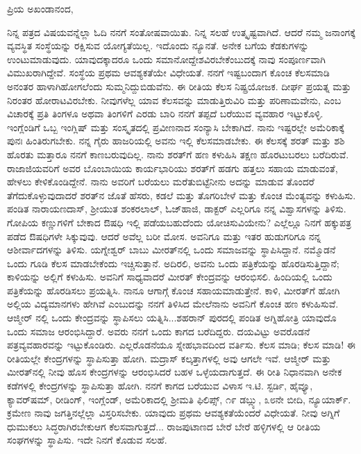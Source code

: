\noindent
ಪ್ರಿಯ ಅಖಂಡಾನಂದ,

ನಿನ್ನ ಪತ್ರದ ವಿಷಯವನ್ನೆಲ್ಲಾ ಓದಿ ನನಗೆ ಸಂತೋಷವಾಯಿತು. ನಿನ್ನ ಸಲಹೆ ಉತ್ಕೃಷ್ಟವಾಗಿದೆ. ಆದರೆ ನಮ್ಮ ಜನಾಂಗಕ್ಕೆ ವ್ಯವಸ್ಥಿತ ಸಂಸ್ಥೆಯನ್ನು ರಕ್ಷಿಸುವ ಯೋಗ್ಯತೆಯಿಲ್ಲ. ಇದೊಂದು ನ್ಯೂನತೆ. ಅನೇಕ ಬಗೆಯ ಕೆಡಕುಗಳನ್ನು ಉಂಟುಮಾಡುವುದು. ಯಾವುದಕ್ಕಾದರೂ ಒಂದು ಸಮಾನೋದ್ದೇಶವಿರಬೇಕೆಂಬುದಕ್ಕೆ ನಾವು ಸಂಪೂರ್ಣವಾಗಿ ವಿಮುಖರಾಗಿದ್ದೇವೆ. ಸಂಸ್ಥೆಯ ಪ್ರಥಮ ಆವಶ್ಯಕತೆಯೇ ವಿಧೇಯತೆ. ನನಗೆ ಇಷ್ಟಬಂದಾಗ ಕೊಂಚ ಕೆಲಸಮಾಡಿ ಅನಂತರ ಹಾಳಾಗಿಹೋಗಲೆಂದು ಸುಮ್ಮನಿದ್ದುಬಿಡುವೆನು. ಈ ರೀತಿಯ ಕೆಲಸ ನಿಷ್ಪ್ರಯೋಜಕ. ದೀರ್ಘ ಪ್ರಯತ್ನ ಮತ್ತು ನಿರಂತರ ಹೋರಾಟವಿರಬೇಕು. ನೀವುಗಳೆಲ್ಲ ಯಾವ ಕೆಲಸವನ್ನು ಮಾಡುತ್ತಿರುವಿರಿ ಮತ್ತು ಪರಿಣಾಮವೇನು, ಎಂಬ ವಿಚಾರಕ್ಕೆ ಪ್ರತಿ ತಿಂಗಳೂ ಅಥವಾ ತಿಂಗಳಿಗೆ ಎರಡು ಬಾರಿ ನನಗೆ ತಪ್ಪದೆ ಬರೆಯುವ ವ್ಯವಹಾರ ಇಟ್ಟುಕೊಳ್ಳಿ. ಇಂಗ್ಲೆಂಡಿಗೆ ಒಬ್ಬ ಇಂಗ್ಲಿಷ್ ಮತ್ತು ಸಂಸ್ಕೃತದಲ್ಲಿ ಪ್ರವೀಣನಾದ ಸಂನ್ಯಾಸಿ ಬೇಕಾಗಿದೆ. ನಾನು ಇಷ್ಟರಲ್ಲೇ ಅಮೆರಿಕಾಕ್ಕೆ ಪುನಃ ಹಿಂತಿರುಗಬೇಕು. ನನ್ನ ಗೈರು ಹಾಜರಿಯಲ್ಲಿ ಅವನು ಇಲ್ಲಿ ಕೆಲಸಮಾಡಬೇಕು. ಈ ಕೆಲಸಕ್ಕೆ ಶರತ್ ಮತ್ತು ಶಶಿ ಹೊರತು ಮತ್ತಾರೂ ನನಗೆ ಕಾಣಬರುವುದಿಲ್ಲ. ನಾನು ಶರತ್‌ಗೆ ಹಣ ಕಳುಹಿಸಿ ತಕ್ಷಣ ಹೊರಟುಬರಲು ಬರೆದಿರುವೆ. ರಾಜಾಜಿಯವರಿಗೆ ಅವರ ಬೊಂಬಾಯಿಯ ಕಾರ್ಯಭಾರಿಯು ಶರತ್‌ಗೆ ಹಡಗು ಹತ್ತಲು ಸಹಾಯ ಮಾಡುವಂತೆ, ಹೇಳಲು ಕೇಳಿಕೊಂಡಿದ್ದೇನೆ. ನಾನು ಅವರಿಗೆ ಬರೆಯಲು ಮರೆತುಬಿಟ್ಟೆ\enginline{-}ನೀನು ಅದನ್ನು ಮಾಡುವ ತೊಂದರೆ ತೆಗೆದುಕೊಳ್ಳುವುದಾದರೆ ಶರತ್‌ನ ಜೊತೆ ಹೆಸರು, ಕಡಲೆ ಮತ್ತು ತೊಗರಿಬೇಳೆ ಮತ್ತು ಕೊಂಚ ಮೆಂತ್ಯವನ್ನು ಕಳುಹಿಸು. ಪಂಡಿತ ನಾರಾಯಣದಾಸ್, ಶ‍್ರೀಯುತ ಶಂಕರಲಾಲ್, ಓಜ್‌ಹಾಜಿ, ಡಾಕ್ಟರ್ ಎಲ್ಲರಿಗೂ ನನ್ನ ವಿಶ್ವಾಸಗಳನ್ನು ತಿಳಿಸು. ಗೋಪಿಯ ಕಣ್ಣುಗಳಿಗೆ ಬೇಕಾದ ಔಷಧಿ ಇಲ್ಲಿ ಪಡೆಯಬಹುದೆಂದು ಯೋಚಿಸುವಿಯೇನು? ಎಲ್ಲೆಲ್ಲೂ ನಿನಗೆ ಹಕ್ಕುಪತ್ರ ಪಡೆದ ಔಷಧಿಗಳೇ ಸಿಕ್ಕುವುವು. ಆದರೆ ಅವೆಲ್ಲ ಬರೀ ಮೋಸ. ಅವನಿಗೂ ಮತ್ತು ಇತರ ಹುಡುಗರಿಗೂ ನನ್ನ ಆಶೀರ್ವಾದಗಳನ್ನು ತಿಳಿಸು. ಯಗ್ನೇಶ್ವರ್ ಬಾಬು ಮೀರತ್‌ನಲ್ಲಿ ಒಂದು ಸಮಾಜವನ್ನು ಸ್ಥಾಪಿಸಿದ್ದಾನೆ. ನಮ್ಮೊಡನೆ ಒಂದು ಗೂಡಿ ಕೆಲಸ ಮಾಡಬೇಕೆಂದು ಇಚ್ಚಿಸುತ್ತಾನೆ. ಅದಿರಲಿ, ಅವನು ಒಂದು ಪತ್ರಿಕೆಯನ್ನು ಹೊರಡಿಸುತ್ತಿದ್ದಾನೆ; ಕಾಳಿಯನ್ನು ಅಲ್ಲಿಗೆ ಕಳುಹಿಸು. ಅವನಿಗೆ ಸಾಧ್ಯವಾದರೆ ಮೀರತ್ ಕೇಂದ್ರವನ್ನು ಆರಂಭಿಸಲಿ. ಹಿಂದಿಯಲ್ಲಿ ಒಂದು ಪತ್ರಿಕೆಯನ್ನು ಹೊರಡಿಸಲು ಪ್ರಯತ್ನಿಸಿ. ನಾನೂ ಆಗಾಗ್ಗೆ ಕೊಂಚ ಸಹಾಯಮಾಡುತ್ತೇನೆ. ಕಾಳಿ, ಮೀರತ್‌ಗೆ ಹೋಗಿ ಅಲ್ಲಿಯ ವಿದ್ಯಮಾನಗಳು ಹೇಗಿವೆ ಎಂಬುದನ್ನು ನನಗೆ ತಿಳಿಸಿದ ಮೇಲೆ\break ನಾನು ಅವನಿಗೆ ಕೊಂಚ ಹಣ ಕಳುಹಿಸುವೆ. ಆಜ್ಮೀರ್ ನಲ್ಲಿ ಒಂದು ಕೇಂದ್ರವನ್ನು ಸ್ಥಾಪಿಸಲು ಯತ್ನಿಸಿ...ಶಹರಾನ್ ಪುರದಲ್ಲಿ ಪಂಡಿತ ಅಗ್ನಿಹೋತ್ರಿ ಯಾವುದೊ ಒಂದು ಸಮಾಜ ಆರಂಭಿಸಿದ್ದಾರೆ. ಅವರು ನನಗೆ ಒಂದು ಕಾಗದ ಬರೆದಿದ್ದರು. ದಯವಿಟ್ಟು ಅವರೊಡನೆ ಪತ್ರವ್ಯವಹಾರವನ್ನು ಇಟ್ಟುಕೊಂಡಿರು. ಎಲ್ಲರೊಡನೆಯೂ ಸ್ನೇಹಭಾವದಿಂದ ವರ್ತಿಸು. ಕೆಲಸ ಮಾಡಿ; ಕೆಲಸ ಮಾಡಿ! ಈ ರೀತಿಯಲ್ಲೇ ಕೇಂದ್ರಗಳನ್ನು ಸ್ಥಾಪಿಸುತ್ತಾ ಹೋಗಿ. ಮದ್ರಾಸ್ ಕಲ್ಕತ್ತಾಗಳಲ್ಲಿ ಅವು ಆಗಲೇ ಇವೆ. ಆಜ್ಮೀರ್ ಮತ್ತು ಮೀರತ್‌ನಲ್ಲಿ ನೀವು ಹೊಸ ಕೇಂದ್ರಗಳನ್ನು ಆರಂಭಿಸಿದರೆ ಬಹಳ ಒಳ್ಳೆಯದಾಗುತ್ತದೆ. ಈ ರೀತಿ ನಿಧಾನವಾಗಿ ಅನೇಕ ಕಡೆಗಳಲ್ಲಿ ಕೇಂದ್ರಗಳನ್ನು ಸ್ಥಾಪಿಸುತ್ತಾ ಹೋಗಿ. ನನಗೆ ಕಾಗದ ಬರೆಯುವ ವಿಳಾಸ  ಇ.ಟಿ. ಸ್ಟರ್ಡಿ, ಹೈವ್ಯೂ, ಕ್ಯಾವರ್‌ಷಮ್, ರೀಡಿಂಗ್, ಇಂಗ್ಲೆಂಡ್, ಅಮೆರಿಕಾದಲ್ಲಿ  ಶ‍್ರೀಮತಿ ಫಿಲಿಪ್ಸ್, ೧೯ ಡಬ್ಲ್ಯು, ೩೮ನೇ ಬೀದಿ, ನ್ಯೂಯಾರ್ಕ್. ಕ್ರಮೇಣ ನಾವು ಜಗತ್ತಿನಲ್ಲೆಲ್ಲಾ ವಿಸ್ತರಿಸಬೇಕು. ಯಾವುದು ಪ್ರಥಮ ಆವಶ್ಯಕತೆಯೆಂದರೆ ವಿಧೇಯತೆ. ನೀವು ಅಗ್ನಿಗೆ ಧುಮುಕಲು ಸಿದ್ಧರಾಗಿರಬೇಕು\enginline{-}ಆಗ ಕೆಲಸವಾಗುತ್ತದೆ... ರಾಜಪುಟಾಣದ ಬೇರೆ ಬೇರೆ ಹಳ್ಳಿಗಳಲ್ಲಿ ಆ ರೀತಿಯ ಸಂಘಗಳನ್ನು ಸ್ಥಾಪಿಸು. ಇದೇ ನಿನಗೆ ಕೊಡುವ ಸಲಹೆ.

